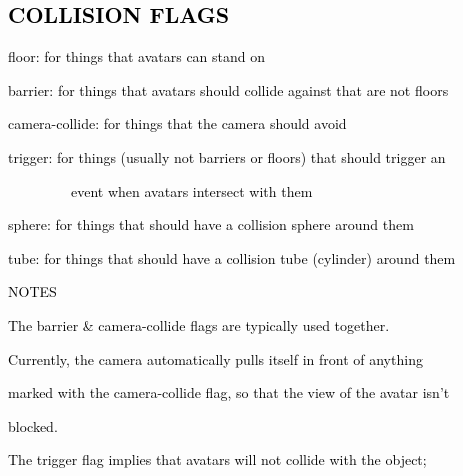 \documentclass[a4paper]{article}
\newcommand\textstyleOOoComputerKeyWord[1]{\textrm{\textcolor[rgb]{0.0,0.0,0.5019608}{#1}}}
\begin{document}
\clearpage\subsection[COLLISION FLAGS]{\textstyleOOoComputerKeyWord{\textcolor{black}{COLLISION FLAGS}}}
\hypertarget{RefHeading7656869075401}{}{\color{black}
\textstyleOOoComputerKeyWord{\textcolor{black}{floor: for things that avatars can stand on}}}

{\color{black}
\textstyleOOoComputerKeyWord{\textcolor{black}{barrier: for things that avatars should collide against that are not
floors}}}

{\color{black}
\textstyleOOoComputerKeyWord{\textcolor{black}{camera-collide: for things that the camera should avoid}}}

{\color{black}
\textstyleOOoComputerKeyWord{\textcolor{black}{trigger: for things (usually not barriers or floors) that should trigger
an}}}

{\color{black}
\textstyleOOoComputerKeyWord{\textcolor{black}{\ \ \ \ \ \ \ \ \ event when avatars intersect with them}}}

{\color{black}
\textstyleOOoComputerKeyWord{\textcolor{black}{sphere: for things that should have a collision sphere around them}}}

{\color{black}
\textstyleOOoComputerKeyWord{\textcolor{black}{tube: for things that should have a collision tube (cylinder) around
them}}}


\bigskip

{\color{black}
\textstyleOOoComputerKeyWord{\textcolor{black}{NOTES}}}


\bigskip

{\color{black}
\textstyleOOoComputerKeyWord{\textcolor{black}{The barrier \& camera-collide flags are typically used together.}}}


\bigskip

{\color{black}
\textstyleOOoComputerKeyWord{\textcolor{black}{Currently, the camera automatically pulls itself in front of anything}}}

{\color{black}
\textstyleOOoComputerKeyWord{\textcolor{black}{marked with the camera-collide flag, so that the view of the avatar
isn't}}}

{\color{black}
\textstyleOOoComputerKeyWord{\textcolor{black}{blocked.}}}


\bigskip

{\color{black}
\textstyleOOoComputerKeyWord{\textcolor{black}{The trigger flag implies that avatars will not collide with the
object;}}}
\end{document}
